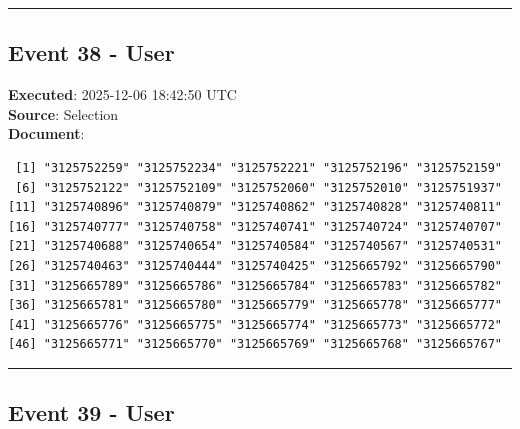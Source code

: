 \documentclass[
  11pt,
]{article}
\newenvironment{Shaded}{\begin{snugshade}}{\end{snugshade}}
\newcommand{\CommentTok}[1]{\textcolor[rgb]{0.56,0.35,0.01}{\textit{#1}}}
\newcommand{\FunctionTok}[1]{\textcolor[rgb]{0.13,0.29,0.53}{\textbf{#1}}}
\newcommand{\NormalTok}[1]{#1}
\newcommand{\OtherTok}[1]{\textcolor[rgb]{0.56,0.35,0.01}{#1}}
\newcommand{\SpecialCharTok}[1]{\textcolor[rgb]{0.81,0.36,0.00}{\textbf{#1}}}
\newenvironment{rpoutput}{\vspace{0.5em}\begin{snugshade}}{\end{snugshade}}
\begin{document}
\begin{center}\rule{0.5\linewidth}{0.5pt}\end{center}

\subsection{Event 38 - User}\label{event-38---user}

\textbf{Executed}: 2025-12-06 18:42:50 UTC\\
\textbf{Source}: Selection\\
\textbf{Document}:

\begin{Shaded}
\end{Shaded}

\begin{rpoutput}

\begin{verbatim}
 [1] "3125752259" "3125752234" "3125752221" "3125752196" "3125752159"
 [6] "3125752122" "3125752109" "3125752060" "3125752010" "3125751937"
[11] "3125740896" "3125740879" "3125740862" "3125740828" "3125740811"
[16] "3125740777" "3125740758" "3125740741" "3125740724" "3125740707"
[21] "3125740688" "3125740654" "3125740584" "3125740567" "3125740531"
[26] "3125740463" "3125740444" "3125740425" "3125665792" "3125665790"
[31] "3125665789" "3125665786" "3125665784" "3125665783" "3125665782"
[36] "3125665781" "3125665780" "3125665779" "3125665778" "3125665777"
[41] "3125665776" "3125665775" "3125665774" "3125665773" "3125665772"
[46] "3125665771" "3125665770" "3125665769" "3125665768" "3125665767"
\end{verbatim}

\end{rpoutput}

\begin{center}\rule{0.5\linewidth}{0.5pt}\end{center}

\subsection{Event 39 - User}\label{event-39---user}
\end{document}
